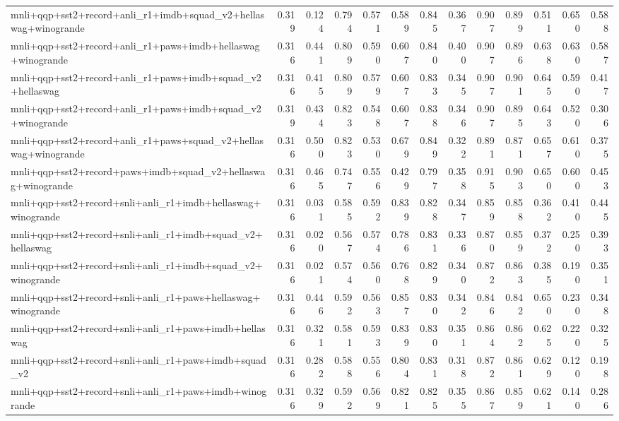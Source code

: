 \begin{table}[t]
\begin{tabular}{lrrrrrrrrrrrr}
    mnli+qqp+sst2+record+anli\_r1+imdb+squad\_v2+hellaswag+winogrande & 0.319 & 0.124 & 0.794 & 0.571 & 0.589 & 0.845 & 0.367 & 0.907 & 0.899 & 0.511 & 0.650 & 0.588 \\
    mnli+qqp+sst2+record+anli\_r1+paws+imdb+hellaswag+winogrande & 0.316 & 0.441 & 0.809 & 0.590 & 0.607 & 0.840 & 0.400 & 0.907 & 0.896 & 0.638 & 0.630 & 0.587 \\
    mnli+qqp+sst2+record+anli\_r1+paws+imdb+squad\_v2+hellaswag & 0.316 & 0.415 & 0.809 & 0.579 & 0.607 & 0.833 & 0.345 & 0.907 & 0.901 & 0.645 & 0.590 & 0.417 \\
    mnli+qqp+sst2+record+anli\_r1+paws+imdb+squad\_v2+winogrande & 0.319 & 0.434 & 0.823 & 0.548 & 0.607 & 0.838 & 0.346 & 0.907 & 0.895 & 0.643 & 0.520 & 0.306 \\
    mnli+qqp+sst2+record+anli\_r1+paws+squad\_v2+hellaswag+winogrande & 0.316 & 0.500 & 0.823 & 0.530 & 0.679 & 0.849 & 0.322 & 0.891 & 0.871 & 0.657 & 0.610 & 0.375 \\
    mnli+qqp+sst2+record+paws+imdb+squad\_v2+hellaswag+winogrande & 0.316 & 0.465 & 0.747 & 0.556 & 0.429 & 0.797 & 0.358 & 0.915 & 0.903 & 0.650 & 0.600 & 0.453 \\
    mnli+qqp+sst2+record+snli+anli\_r1+imdb+hellaswag+winogrande & 0.316 & 0.031 & 0.585 & 0.592 & 0.839 & 0.828 & 0.347 & 0.859 & 0.858 & 0.362 & 0.410 & 0.445 \\
    mnli+qqp+sst2+record+snli+anli\_r1+imdb+squad\_v2+hellaswag & 0.316 & 0.020 & 0.567 & 0.574 & 0.786 & 0.831 & 0.336 & 0.870 & 0.859 & 0.372 & 0.250 & 0.393 \\
    mnli+qqp+sst2+record+snli+anli\_r1+imdb+squad\_v2+winogrande & 0.316 & 0.021 & 0.574 & 0.560 & 0.768 & 0.829 & 0.340 & 0.872 & 0.863 & 0.385 & 0.190 & 0.351 \\
    mnli+qqp+sst2+record+snli+anli\_r1+paws+hellaswag+winogrande & 0.316 & 0.446 & 0.592 & 0.563 & 0.857 & 0.830 & 0.342 & 0.846 & 0.842 & 0.650 & 0.230 & 0.348 \\
    mnli+qqp+sst2+record+snli+anli\_r1+paws+imdb+hellaswag & 0.316 & 0.321 & 0.581 & 0.593 & 0.839 & 0.830 & 0.351 & 0.864 & 0.862 & 0.625 & 0.220 & 0.325 \\
    mnli+qqp+sst2+record+snli+anli\_r1+paws+imdb+squad\_v2 & 0.316 & 0.282 & 0.588 & 0.556 & 0.804 & 0.831 & 0.318 & 0.872 & 0.861 & 0.629 & 0.120 & 0.198 \\
    mnli+qqp+sst2+record+snli+anli\_r1+paws+imdb+winogrande & 0.316 & 0.329 & 0.592 & 0.569 & 0.821 & 0.825 & 0.355 & 0.867 & 0.859 & 0.621 & 0.140 & 0.286 \\

\end{tabular}
\end{table}
